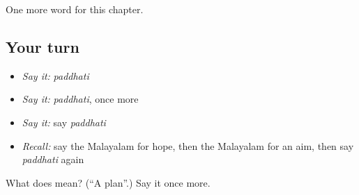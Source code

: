 \begin{grammarlens}[title={What you've built}]
One more word for this chapter.
\end{grammarlens}

\subsection*{Your turn}
\begin{itemize}
\raggedright
  \item \emph{Say it:} \emph{paddhati}
  \item \emph{Say it:} \emph{paddhati}, once more
  \item \emph{Say it:} say \emph{paddhati}
  \item \emph{Recall:} say the Malayalam for hope, then the Malayalam for an aim, then say \emph{paddhati} again
\end{itemize}

\begin{tcolorbox}[breakable,colback=teal!4,colframe=teal!35!black,title={Before you move on}]
What does  mean? (\textquotedblleft{}A plan\textquotedblright{}.) Say it once more.
\end{tcolorbox}

